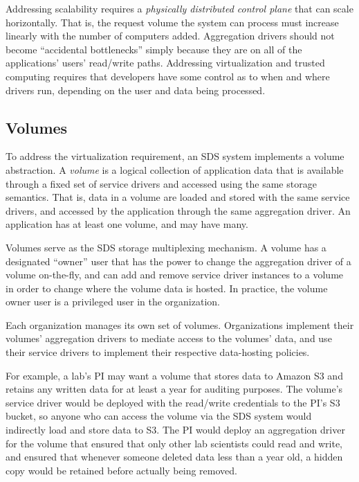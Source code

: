 Addressing scalability requires a \emph{physically distributed control plane} that can
scale horizontally.  That is, the request volume the system can process must
increase linearly with the number of computers added.
Aggregation drivers should not become ``accidental
bottlenecks'' simply because they are on all of the applications' users' read/write paths.
Addressing virtualization and trusted computing requires that developers have some
control as to when and where drivers run, depending on the user and data being
processed.

\subsection{Volumes}

To address the virtualization requirement, an SDS system
implements a volume abstraction.  A \emph{volume} is a logical collection of
application data that is available through a fixed set of service drivers and accessed
using the same storage semantics.  That is, data in a volume are loaded and
stored with the same service drivers, and accessed by the application through
the same aggregation driver.  An application has at least one volume, and may have many.

Volumes serve as the SDS storage multiplexing mechanism.
A volume has a designated ``owner'' user that has the power to
change the aggregation driver of a volume on-the-fly, and can add and remove
service driver instances to a volume in order to change where the volume data is
hosted.  In practice, the volume owner user is a privileged
user in the organization.

Each organization manages its own set of volumes.  Organizations implement their
volumes' aggregation drivers to mediate access to the volumes' data,
and use their service drivers to implement their respective data-hosting policies.

For example, a lab's PI may want a volume that stores data to Amazon S3 and
retains any written data for at least a year for auditing purposes.  The
volume's service driver would be deployed with the read/write credentials to the
PI's S3 bucket, so anyone who can access the volume via the SDS system would indirectly load and
store data to S3.  The PI would deploy an aggregation driver for the volume that
ensured that only other lab scientists could read and write, and ensured
that whenever someone deleted data less than a year old, a hidden copy would be retained
before actually being removed.

